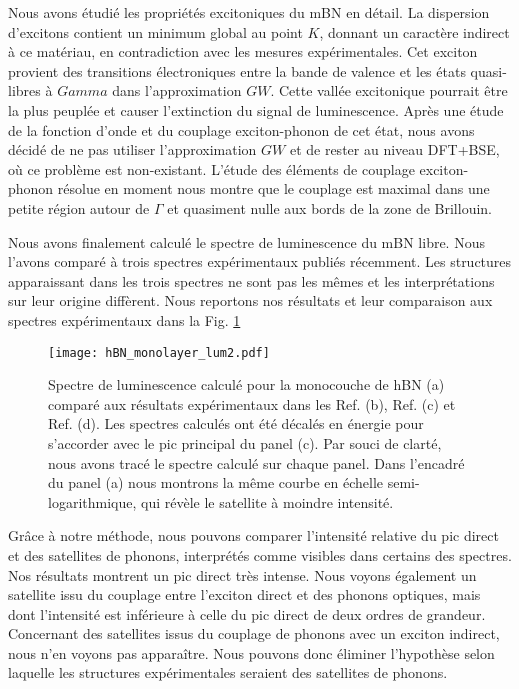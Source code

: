Nous avons étudié les propriétés excitoniques du mBN en détail. La dispersion d'excitons contient un minimum global au point $K$, donnant un caractère indirect à ce matériau, en contradiction avec les mesures expérimentales. Cet exciton provient des transitions électroniques entre la bande de valence et les états quasi-libres à $Gamma$ dans l'approximation $GW$. Cette vallée excitonique pourrait être la plus peuplée et causer l'extinction du signal de luminescence. Après une étude de la fonction d'onde et du couplage exciton-phonon de cet état, nous avons décidé de ne pas utiliser l'approximation $GW$ et de rester au niveau DFT+BSE, où ce problème est non-existant. L'étude des éléments de couplage exciton-phonon résolue en moment nous montre que le couplage est maximal dans une petite région autour de $\Gamma$ et quasiment nulle aux bords de la zone de Brillouin.

Nous avons finalement calculé le spectre de luminescence du mBN libre. Nous l'avons comparé à trois spectres expérimentaux publiés récemment. Les structures apparaissant dans les trois spectres ne sont pas les mêmes et les interprétations sur leur origine diffèrent. Nous reportons nos résultats et leur comparaison aux spectres expérimentaux dans la Fig. \ref{fig:mBN_PL_fr}
\begin{figure}[H]
	\vspace{0.2cm}
	\setcapindent{2em}
	\centering
	\texttt{[image: hBN\_monolayer\_lum2.pdf]}
	\caption{\footnotesize{Spectre de luminescence calculé pour la monocouche de hBN (a) comparé aux résultats expérimentaux dans les Ref. \cite{elias2019direct}(b), Ref. \cite{rousseau2021monolayer}(c) et Ref. \cite{wang2022scalable}(d). Les spectres calculés ont été décalés en énergie pour s'accorder avec le pic principal du panel (c). Par souci de clarté, nous avons tracé le spectre calculé sur chaque panel. Dans l'encadré du panel (a) nous montrons la même courbe en échelle semi-logarithmique, qui révèle le satellite à moindre intensité.}}
	\label{fig:mBN_PL_fr} 
\end{figure}

Grâce à notre méthode, nous pouvons comparer l'intensité relative du pic direct et des satellites de phonons, interprétés comme visibles dans certains des spectres. Nos résultats montrent un pic direct très intense. Nous voyons également un satellite issu du couplage entre l'exciton direct et des phonons optiques, mais dont l'intensité est inférieure à celle du pic direct de deux ordres de grandeur. Concernant des satellites issus du couplage de phonons avec un exciton indirect, nous n'en voyons pas apparaître. Nous pouvons donc éliminer l'hypothèse selon laquelle les structures expérimentales seraient des satellites de phonons. 

